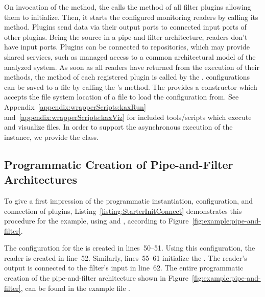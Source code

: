 \medskip

\noindent On invocation of the  method, the  %
calls the  method of all filter plugins allowing them to initialize. %
Then, it starts the configured monitoring readers by calling its  %
method. Plugins send data via their output ports to connected input ports of other
plugins. Being the source in a pipe-and-filter architecture, readers don't have %
input ports. Plugins can be connected to repositories, which may provide %
shared services, such as managed access to a common architectural model %
of the analyzed system. As soon as all readers have returned from the execution of their 
methods, the method  of each registered plugin is called by the %
. \KiekerAnalysisPart{} configurations can be saved %
to a  file by calling the 's  method. %
The  provides a constructor which accepts the %
file system location of a  file to load the configuration from. %
See Appendix~\ref{appendix:wrapperScripts:kaxRun} and~\ref{appendix:wrapperScripts:kaxViz} %
for included tools/scripts which execute and visualize  files.
In order to support the asynchronous execution of the  instance, %
we provide the  class.

\subsection{Programmatic Creation of Pipe-and-Filter Architectures}\label{sec:analysis:programmaticCreation}

To give a first impression of the programmatic %
instantiation, configuration, and connection of plugins, Listing~\ref{listing:StarterInitConnect} %
demonstrates this procedure for the example, using  and %
, according to Figure~\ref{fig:example:pipe-and-filter}.

The configuration for the  is created in lines~50--51. %
Using this configuration, the reader is created in line~52. Similarly, %
lines~55--61 initialize the . The reader's output is connected %
to the filter's input in line~62. %
The entire programmatic creation of the pipe-and-filter architecture shown %
in Figure~\ref{fig:example:pipe-and-filter}, can be found in the example  %
file .

